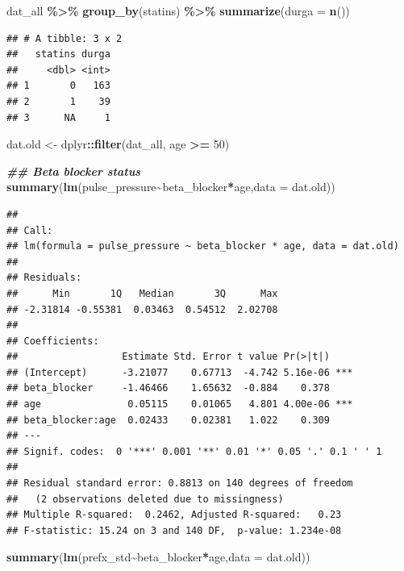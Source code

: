 \documentclass[
]{article}
\newenvironment{Shaded}{\begin{snugshade}}{\end{snugshade}}
\newcommand{\AttributeTok}[1]{\textcolor[rgb]{0.13,0.29,0.53}{#1}}
\newcommand{\DecValTok}[1]{\textcolor[rgb]{0.00,0.00,0.81}{#1}}
\newcommand{\DocumentationTok}[1]{\textcolor[rgb]{0.56,0.35,0.01}{\textbf{\textit{#1}}}}
\newcommand{\FunctionTok}[1]{\textcolor[rgb]{0.13,0.29,0.53}{\textbf{#1}}}
\newcommand{\NormalTok}[1]{#1}
\newcommand{\OtherTok}[1]{\textcolor[rgb]{0.56,0.35,0.01}{#1}}
\newcommand{\SpecialCharTok}[1]{\textcolor[rgb]{0.81,0.36,0.00}{\textbf{#1}}}
\begin{document}
\begin{Shaded}
\begin{Highlighting}[]
\NormalTok{dat\_all }\SpecialCharTok{\%\textgreater{}\%} \FunctionTok{group\_by}\NormalTok{(statins) }\SpecialCharTok{\%\textgreater{}\%} \FunctionTok{summarize}\NormalTok{(}\AttributeTok{durga =} \FunctionTok{n}\NormalTok{())}
\end{Highlighting}
\end{Shaded}

\begin{verbatim}
## # A tibble: 3 x 2
##   statins durga
##     <dbl> <int>
## 1       0   163
## 2       1    39
## 3      NA     1
\end{verbatim}

\begin{Shaded}
\begin{Highlighting}[]
\NormalTok{dat.old }\OtherTok{\textless{}{-}}\NormalTok{ dplyr}\SpecialCharTok{::}\FunctionTok{filter}\NormalTok{(dat\_all, age }\SpecialCharTok{\textgreater{}=} \DecValTok{50}\NormalTok{)}

\DocumentationTok{\#\# Beta blocker status}
\FunctionTok{summary}\NormalTok{(}\FunctionTok{lm}\NormalTok{(pulse\_pressure}\SpecialCharTok{\textasciitilde{}}\NormalTok{beta\_blocker}\SpecialCharTok{*}\NormalTok{age,}\AttributeTok{data =}\NormalTok{ dat.old))}
\end{Highlighting}
\end{Shaded}

\begin{verbatim}
## 
## Call:
## lm(formula = pulse_pressure ~ beta_blocker * age, data = dat.old)
## 
## Residuals:
##      Min       1Q   Median       3Q      Max 
## -2.31814 -0.55381  0.03463  0.54512  2.02708 
## 
## Coefficients:
##                  Estimate Std. Error t value Pr(>|t|)    
## (Intercept)      -3.21077    0.67713  -4.742 5.16e-06 ***
## beta_blocker     -1.46466    1.65632  -0.884    0.378    
## age               0.05115    0.01065   4.801 4.00e-06 ***
## beta_blocker:age  0.02433    0.02381   1.022    0.309    
## ---
## Signif. codes:  0 '***' 0.001 '**' 0.01 '*' 0.05 '.' 0.1 ' ' 1
## 
## Residual standard error: 0.8813 on 140 degrees of freedom
##   (2 observations deleted due to missingness)
## Multiple R-squared:  0.2462, Adjusted R-squared:   0.23 
## F-statistic: 15.24 on 3 and 140 DF,  p-value: 1.234e-08
\end{verbatim}

\begin{Shaded}
\begin{Highlighting}[]
\FunctionTok{summary}\NormalTok{(}\FunctionTok{lm}\NormalTok{(prefx\_std}\SpecialCharTok{\textasciitilde{}}\NormalTok{beta\_blocker}\SpecialCharTok{*}\NormalTok{age,}\AttributeTok{data =}\NormalTok{ dat.old))}
\end{Highlighting}
\end{Shaded}
\end{document}
